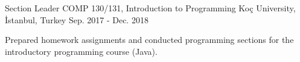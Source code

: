 \begin{cventries}
    \cventry
    {Section Leader}%
    {COMP 130/131, Introduction to Programming}%
    {Koç University, İstanbul, Turkey}
    {Sep. 2017 - Dec. 2018}
    {
      \begin{cvitems}
        \item {Prepared homework assignments and conducted programming sections for the introductory programming course (Java).}
      \end{cvitems}
    }


\end{cventries}
